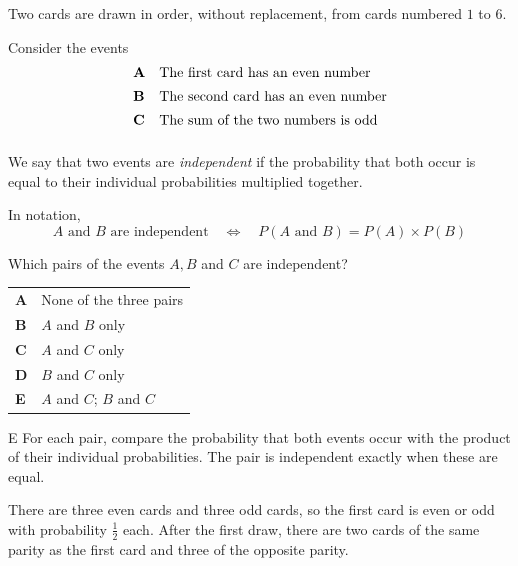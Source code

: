 \documentclass[11pt,a4paper]{article}
\begin{document}
\begin{enumerate}[label=\textbf{\arabic*.},leftmargin=*,itemsep=0pt,start=14]
Two cards are drawn in order, without replacement, from cards numbered $1$ to $6$. 

Consider the events
\[
\begin{array}{@{}ll@{}}
\textbf{A} & \text{The first card has an even number} \\[5pt]
\textbf{B} & \text{The second card has an even number} \\[5pt]
\textbf{C} & \text{The sum of the two numbers is odd} \\[5pt]
\end{array}
\]

We say that two events are \emph{independent} if the probability that both occur is equal to their individual probabilities multiplied together.

In notation, \[A \text{ and } B \text{ are independent} \quad\iff\quad P(A \text{ and } B) = P(A)\times P(B)\]

Which pairs of the events $A, B$ and $C$ are independent?

\par\vspace*{12pt}
\begin{tabularx}{\linewidth}{@{}>{\bfseries}l Y@{}}
A &
None of the three pairs
\\[0.8em]
B &
$A$ and $B$ only
\\[0.8em]
C &
$A$ and $C$ only
\\[0.8em]
D &
$B$ and $C$ only
\\[0.8em]
E &
$A$ and $C$; $B$ and $C$
\\
\end{tabularx}

\begin{djsSolution}{E}
For each pair, compare the probability that both events occur with the product of their individual probabilities. The pair is independent exactly when these are equal.

There are three even cards and three odd cards, so the first card is even or odd with probability $\frac12$ each. After the first draw, there are two cards of the same parity as the first card and three of the opposite parity.


\end{djsSolution}
\end{enumerate}
\end{document}
